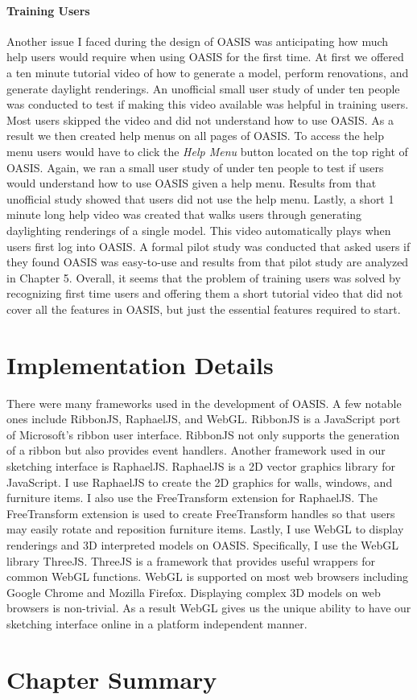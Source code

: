 \paragraph{Training Users}
Another issue I faced during the design of OASIS was anticipating how much help users would require when using OASIS for the first time. At first we offered a ten minute tutorial video of how to generate a model, perform renovations, and generate daylight renderings. An unofficial small user study of under ten people was conducted to test if making this video available was helpful in training users. Most users skipped the video and did not understand how to use OASIS. As a result we then created help menus on all pages of OASIS. To access the help menu users would have to click the \textit{Help Menu} button located on the top right of OASIS. Again, we ran a small user study of under ten people to test if users would understand how to use OASIS given a help menu.
Results from that unofficial study showed that users did not use the help menu.
Lastly, a short 1 minute long help video was created that walks users through generating daylighting renderings of a single model. This video automatically plays when users first log into OASIS.
A formal pilot study was conducted that asked users if they found OASIS was easy-to-use and results from that pilot study are analyzed in Chapter 5. Overall, it seems that the problem of training users was solved by recognizing first time users and offering them a short tutorial video that did not cover all the features in OASIS, but just the essential features required to start.

\section{Implementation Details}
There were many frameworks used in the development of OASIS.
A few notable ones include RibbonJS, RaphaelJS, and WebGL.
RibbonJS is a JavaScript port of Microsoft's ribbon user interface.
RibbonJS not only supports the generation of a ribbon but also provides event handlers.
Another framework used in our sketching interface is RaphaelJS\cite{todo}.
RaphaelJS is a 2D vector graphics library for JavaScript. 
I use RaphaelJS to create the 2D graphics for walls, windows, and furniture items.
 I also use the FreeTransform extension for RaphaelJS\cite{todo}. 
The FreeTransform extension is used to create FreeTransform handles so that users may easily rotate and reposition furniture items.
Lastly, I use WebGL to display renderings and 3D interpreted models on OASIS. 
Specifically, I use the WebGL library ThreeJS\cite{todo}.
ThreeJS is a framework that provides useful wrappers for common WebGL functions.
WebGL is supported on most web browsers including Google Chrome and Mozilla Firefox\cite{todo}.
Displaying complex 3D models on web browsers is non-trivial.
As a result WebGL gives us the unique ability to have our sketching interface online in a platform independent manner.



\section{Chapter Summary}

